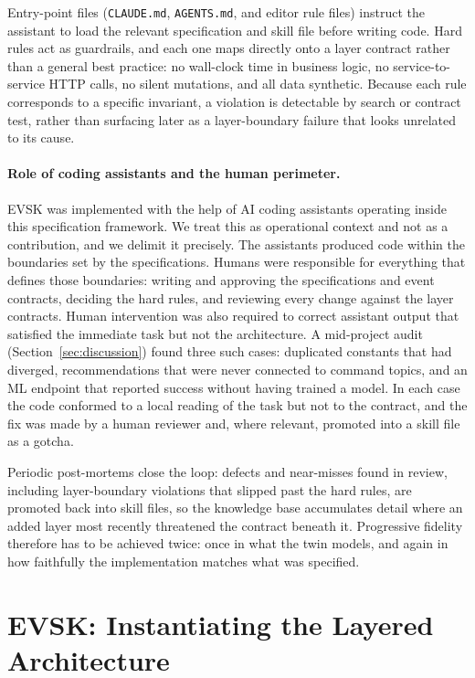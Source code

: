 \documentclass[runningheads]{llncs}
\begin{document}
Entry-point files (\texttt{CLAUDE.md}, \texttt{AGENTS.md}, and editor rule files) instruct the assistant to load the relevant specification and skill file before writing code. Hard rules act as guardrails, and each one maps directly onto a layer contract rather than a general best practice: no wall-clock time in business logic, no service-to-service HTTP calls, no silent mutations, and all data synthetic. Because each rule corresponds to a specific invariant, a violation is detectable by search or contract test, rather than surfacing later as a layer-boundary failure that looks unrelated to its cause.

\paragraph{Role of coding assistants and the human perimeter.}
EVSK was implemented with the help of AI coding assistants operating inside this specification framework. We treat this as operational context and not as a contribution, and we delimit it precisely. The assistants produced code within the boundaries set by the specifications. Humans were responsible for everything that defines those boundaries: writing and approving the specifications and event contracts, deciding the hard rules, and reviewing every change against the layer contracts. Human intervention was also required to correct assistant output that satisfied the immediate task but not the architecture. A mid-project audit (Section~\ref{sec:discussion}) found three such cases: duplicated constants that had diverged, recommendations that were never connected to command topics, and an ML endpoint that reported success without having trained a model. In each case the code conformed to a local reading of the task but not to the contract, and the fix was made by a human reviewer and, where relevant, promoted into a skill file as a gotcha.

Periodic post-mortems close the loop: defects and near-misses found in review, including layer-boundary violations that slipped past the hard rules, are promoted back into skill files, so the knowledge base accumulates detail where an added layer most recently threatened the contract beneath it. Progressive fidelity therefore has to be achieved twice: once in what the twin models, and again in how faithfully the implementation matches what was specified.

\section{EVSK: Instantiating the Layered Architecture}\label{sec:implementation}
\end{document}
